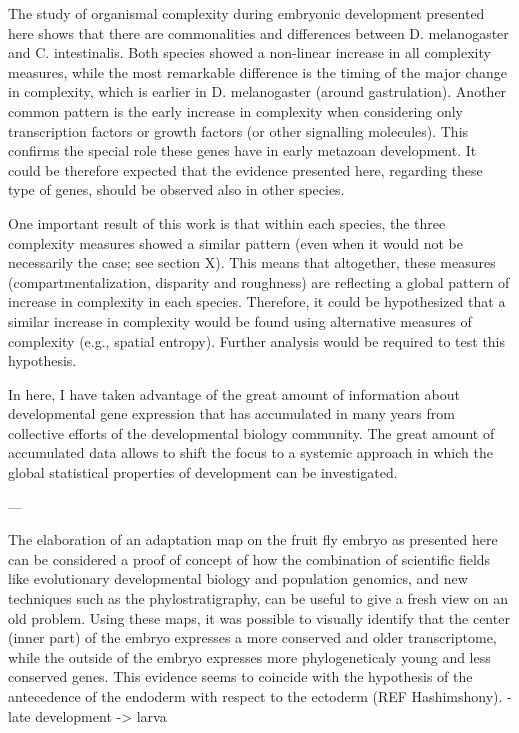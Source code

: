 

The study of organismal complexity during embryonic development presented here shows that there are commonalities and differences between D. melanogaster and C. intestinalis. Both species showed a non-linear increase in all complexity measures, while the most remarkable difference is the timing of the major change in complexity, which is earlier in D. melanogaster (around gastrulation).
Another common pattern is the early increase in complexity when considering only transcription factors or growth factors (or other signalling molecules). This confirms the special role these genes have in early metazoan development. It could be therefore expected that the evidence presented here, regarding these type of genes, should be observed also in other species. 

One important result of this work is that within each species, the three complexity measures showed a similar pattern (even when it would not be necessarily the case; see section X). This means that altogether, these measures (compartmentalization, disparity and roughness) are reflecting a global pattern of increase in complexity in each species. Therefore, it could be hypothesized that a similar increase in complexity would be found using alternative measures of complexity (e.g., spatial entropy). Further analysis would be required to test this hypothesis.

In here, I have taken advantage of the great amount of information about developmental gene expression that has accumulated in many years from collective efforts of the developmental biology community. The great amount of accumulated data allows to shift the focus to a systemic approach in which the global statistical properties of development can be investigated.


---


The elaboration of an adaptation map on the fruit fly embryo as presented here can be considered a proof of concept of how the combination of scientific fields like evolutionary developmental biology and population genomics, and new techniques such as the phylostratigraphy, can be useful to give a fresh view on an old problem.
Using these maps, it was possible to visually identify that the center (inner part) of the embryo expresses a more conserved and older transcriptome, while the outside of the embryo expresses more phylogeneticaly young and less conserved genes. This evidence seems to coincide with the hypothesis of the antecedence of the endoderm with respect to the ectoderm (REF Hashimshony). 
-late development -> larva

